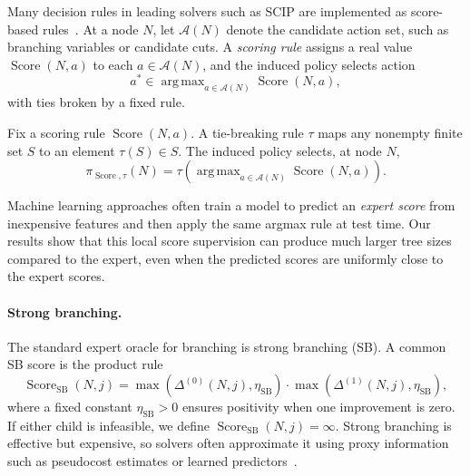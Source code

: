 \documentclass[smallextended,envcountsect]{svjour3} %
\newcommand{\Acal}{\mathcal{A}}
\newcommand{\0}{\mathbf{0}}
\DeclareMathOperator{\argmax}{arg\,max} %
\DeclareMathOperator{\Score}{Score} %
\newcommand{\1}{\mathbf{1}} %
\begin{document}
Many decision rules in leading solvers such as SCIP are implemented as score-based rules~\citep{achterberg2009scip}.
At a node $N$, let $\Acal(N)$ denote the candidate action set, such as branching variables or candidate cuts.
A \emph{scoring rule} assigns a real value $\Score(N,a)$ to each $a\in\Acal(N)$, and the induced policy selects action
\[
  a^*\in\argmax_{a\in \Acal(N)} \Score(N,a),
\]
with ties broken by a fixed rule.

\begin{definition}\label{def:score_based_policy}
	Fix a scoring rule $\Score(N,a)$.
	A tie-breaking rule $\tau$ maps any nonempty finite set $S$ to an element $\tau(S)\in S$.
	The induced policy selects, at node $N$,
	\[
		\pi_{\Score,\tau}(N)=\tau\!\left(\argmax_{a\in\Acal(N)}\Score(N,a)\right).
	\]
\end{definition}

Machine learning approaches often train a model to predict an \emph{expert score} from inexpensive features and then apply the same argmax rule at test time.
Our results show that this local score supervision can produce much larger tree sizes compared to the expert, even when the predicted scores are uniformly close to the expert scores.

\paragraph{Strong branching.}
The standard expert oracle for branching is strong branching (SB).
A common SB score is the product rule
\begin{equation}\label{eq:sb_score}
  \Score_{\mathrm{SB}}(N, j)
   = \max(\Delta^{(0)}(N, j), \eta_{\mathrm{SB}})
   \cdot \max(\Delta^{(1)}(N, j), \eta_{\mathrm{SB}}),
\end{equation}
where a fixed constant $\eta_{\mathrm{SB}}>0$ ensures positivity when one improvement is zero.
If either child is infeasible, we define $\Score_{\mathrm{SB}}(N,j)=\infty$.
Strong branching is effective but expensive, so solvers often approximate it using proxy information such as pseudocost estimates or learned predictors~\citep{achterberg2009scip,achterberg2007constraint,Khalil2016,Alvarez2017,gasse2019exact,Gupta2020}.
\end{document}
